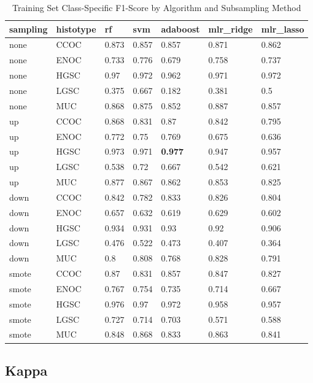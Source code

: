 \documentclass[
]{report}
\begin{document}
\begin{table}

\caption{\label{tab:train-f1-class-table}Training Set Class-Specific F1-Score by Algorithm and Subsampling Method}
\centering
\begin{tabular}[t]{l|l|l|l|l|l|l}
\hline
sampling & histotype & rf & svm & adaboost & mlr\_ridge & mlr\_lasso\\
\hline
none & CCOC & 0.873 & 0.857 & 0.857 & 0.871 & 0.862\\
\hline
none & ENOC & 0.733 & 0.776 & 0.679 & 0.758 & 0.737\\
\hline
none & HGSC & 0.97 & 0.972 & 0.962 & 0.971 & 0.972\\
\hline
none & LGSC & 0.375 & 0.667 & 0.182 & 0.381 & 0.5\\
\hline
none & MUC & 0.868 & 0.875 & 0.852 & 0.887 & 0.857\\
\hline
up & CCOC & 0.868 & 0.831 & 0.87 & 0.842 & 0.795\\
\hline
up & ENOC & 0.772 & 0.75 & 0.769 & 0.675 & 0.636\\
\hline
up & HGSC & 0.973 & 0.971 & \textbf{0.977} & 0.947 & 0.957\\
\hline
up & LGSC & 0.538 & 0.72 & 0.667 & 0.542 & 0.621\\
\hline
up & MUC & 0.877 & 0.867 & 0.862 & 0.853 & 0.825\\
\hline
down & CCOC & 0.842 & 0.782 & 0.833 & 0.826 & 0.804\\
\hline
down & ENOC & 0.657 & 0.632 & 0.619 & 0.629 & 0.602\\
\hline
down & HGSC & 0.934 & 0.931 & 0.93 & 0.92 & 0.906\\
\hline
down & LGSC & 0.476 & 0.522 & 0.473 & 0.407 & 0.364\\
\hline
down & MUC & 0.8 & 0.808 & 0.768 & 0.828 & 0.791\\
\hline
smote & CCOC & 0.87 & 0.831 & 0.857 & 0.847 & 0.827\\
\hline
smote & ENOC & 0.767 & 0.754 & 0.735 & 0.714 & 0.667\\
\hline
smote & HGSC & 0.976 & 0.97 & 0.972 & 0.958 & 0.957\\
\hline
smote & LGSC & 0.727 & 0.714 & 0.703 & 0.571 & 0.588\\
\hline
smote & MUC & 0.848 & 0.868 & 0.833 & 0.863 & 0.841\\
\hline
\end{tabular}
\end{table}

\hypertarget{kappa}{%
\subsection{Kappa}\label{kappa}}
\end{document}
